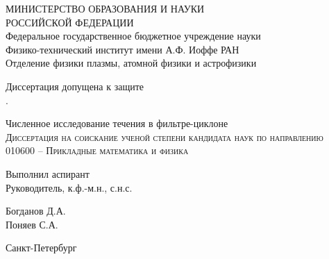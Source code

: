 \renewcommand\normalsize{\fontsize{12pt}{14pt}\selectfont}
\begin{titlepage}
	\begin{center}
		\small{МИНИСТЕРСТВО ОБРАЗОВАНИЯ И НАУКИ \\ РОССИЙСКОЙ ФЕДЕРАЦИИ \\
Федеральное государственное бюджетное учреждение науки  \\
Физико-технический институт имени А.Ф. Иоффе РАН\\
Отделение физики плазмы, атомной физики и астрофизики}\\
		\vspace{0.05\textheight}
	\end{center}
	\begin{flushright}
		\normalsize
			Диссертация допущена к защите \\
			\underline{\hspace{2em}} \underline{\hspace{9em}} \the\yearг. \\
	\end{flushright}
	\begin{center}
		\vspace{0.1\textheight}
		\large{Численное исследование течения в фильтре-циклоне}\\
		\vspace{0.01\textheight}
		\normalsize
		\textsc{Диссертация на соискание ученой степени кандидата наук по направлению 010600 – Прикладные математика и физика}
		\vspace{0.25\textheight}
	\end{center}
	\begin{minipage}{0.48\textwidth}
		\begin{flushleft}
			Выполнил аспирант\\
			Руководитель, к.ф.-м.н., с.н.с.\\
		\end{flushleft}
	\end{minipage}
	\begin{minipage}{0.5\textwidth}
		\begin{flushright}
			Богданов Д.А. \\
			Поняев С.А. \\
		\end{flushright}
	\end{minipage}
	\vspace{0.1\textheight}
	\begin{center}
		Санкт-Петербург \\
		\the\year
	\end{center}
\end{titlepage}
\newpage
\renewcommand\normalsize{\fontsize{14pt}{24pt}\selectfont}